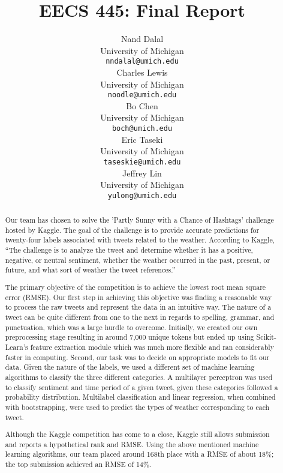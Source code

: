 \documentclass{article}
\title{EECS 445: Final Report}
\author{
Nand Dalal \\
University of Michigan \\
\texttt{nndalal@umich.edu} \\
\And
Charles Lewis \\
University of Michigan \\
\texttt{noodle@umich.edu} \\
\And
Bo Chen \\
University of Michigan \\
\texttt{boch@umich.edu} \\
\And
Eric Taseki \\
University of Michigan \\
\texttt{taseskie@umich.edu} \\
\And
Jeffrey Lin \\
University of Michigan \\
\texttt{yulong@umich.edu} \\
}
\begin{document}
\maketitle

\begin{abstract}
Our team has chosen to solve the 'Partly Sunny with a Chance of Hashtags' challenge hosted by Kaggle. The goal of the challenge is to provide accurate predictions for twenty-four labels associated with tweets related to the weather. According to Kaggle, ``The challenge is to analyze the tweet and determine whether it has a positive, negative, or neutral sentiment, whether the weather occurred in the past, present, or future, and what sort of weather the tweet references.''

The primary objective of the competition is to achieve the lowest root mean square error (RMSE). Our first step in achieving this objective was finding a reasonable way to process the raw tweets and represent the data in an intuitive way. The nature of a tweet can be quite different from one to the next in regards to spelling, grammar, and punctuation, which was a large hurdle to overcome. Initially, we created our own preprocessing stage resulting in around 7,000 unique tokens but ended up using Scikit-Learn's feature extraction module which was much more flexible and ran considerably faster in computing. Second, our task was to decide on appropriate models to fit our data. Given the nature of the labels, we used a different set of machine learning algorithms to classify the three different categories. A multilayer perceptron was used to classify sentiment and time period of a given tweet, given these categories followed a probability distribution. Multilabel classification and linear regression, when combined with bootstrapping, were used to predict the types of weather corresponding to each tweet.

Although the Kaggle competition has come to a close, Kaggle still allows submission and reports a hypothetical rank and RMSE. Using the above mentioned machine learning algorithms, our team placed around 168th place with a RMSE of about 18\%; the top submission achieved an RMSE of 14\%.
\end{abstract}

\newpage
\end{document}
